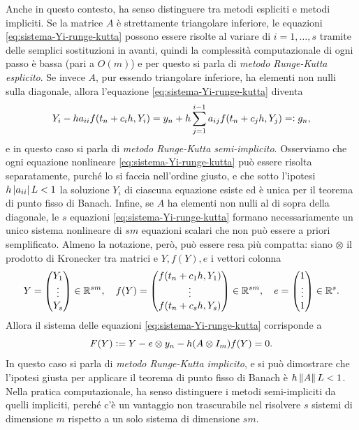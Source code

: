 Anche in questo contesto, ha senso distinguere tra metodi espliciti e metodi
impliciti. Se la matrice $A$ è strettamente triangolare inferiore, le
equazioni \eqref{eq:sistema-Yi-runge-kutta} possono essere risolte
al variare di $i = 1,\dots,s$ tramite delle semplici sostituzioni in avanti,
quindi la complessità computazionale di ogni passo è bassa (pari a $O(m)$)
e per questo si parla di \emph{metodo Runge-Kutta esplicito}.
Se invece $A$, pur essendo triangolare inferiore, ha elementi non nulli
sulla diagonale, allora l'equazione \eqref{eq:sistema-Yi-runge-kutta} diventa
\[
Y_i - ha_{ii}f(t_n+c_i h,Y_i)
= y_n + h \sum_{j=1}^{i-1} a_{ij} f(t_n + c_j h, Y_j)
=\vcentcolon g_n,
\]
e in questo caso si parla di \emph{metodo Runge-Kutta semi-implicito}.
Osserviamo che ogni equazione nonlineare \eqref{eq:sistema-Yi-runge-kutta}
può essere risolta separatamente, purché lo si faccia nell'ordine giusto,
e che sotto l'ipotesi $h \left\lvert a_{ii}\right\rvert L < 1$ la soluzione $Y_i$
di ciascuna equazione esiste ed è unica per il teorema di punto fisso di Banach.
Infine, se $A$ ha elementi non nulli al di sopra della diagonale, le $s$
equazioni \eqref{eq:sistema-Yi-runge-kutta} formano necessariamente un
unico sistema nonlineare di $sm$ equazioni scalari che non può essere
a priori semplificato. Almeno la notazione, però, può essere resa più compatta:
siano $\otimes$ il prodotto di Kronecker tra matrici e $Y,f(Y),e$
i vettori colonna
\[
Y = \begin{pmatrix}
Y_1 \\ 
\vdots \\ 
Y_s \\
\end{pmatrix} \in \mathbb{R}^{sm}, \quad
f(Y) = \begin{pmatrix}
f(t_n+c_1 h, Y_1) \\ 
\vdots \\ 
f(t_n+c_s h, Y_s) \\
\end{pmatrix} \in \mathbb{R}^{sm}, \quad
e = \begin{pmatrix}
1 \\ 
\vdots \\ 
1 \\
\end{pmatrix} \in \mathbb{R}^{s}.
\]
Allora il sistema delle equazioni \eqref{eq:sistema-Yi-runge-kutta} corrisponde a
\[
F(Y) \vcentcolon= Y - e \otimes y_n - h (A \otimes I_m) f(Y) = 0.
\]
In questo caso si parla di \emph{metodo Runge-Kutta implicito}, e si può
dimostrare che l'ipotesi giusta per applicare il teorema di punto fisso
di Banach è $h \left\lVert A\right\rVert L < 1$.
Nella pratica computazionale, ha senso distinguere i metodi semi-impliciti
da quelli impliciti, perché c'è un vantaggio non trascurabile nel risolvere
$s$ sistemi di dimensione $m$ rispetto a un solo sistema di dimensione $sm$.

